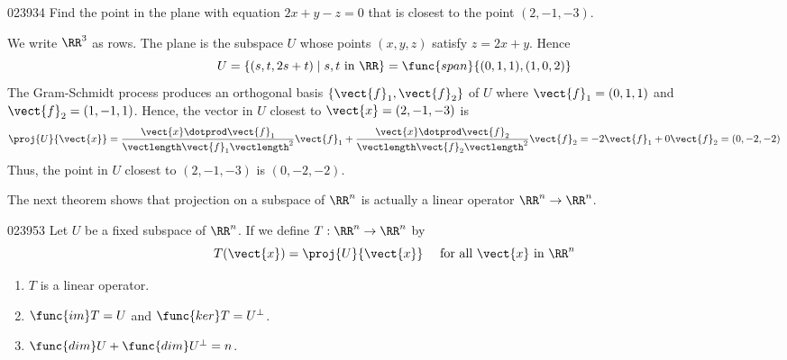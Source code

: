 \begin{example}{}{023934}
Find the point in the plane with equation $2x + y - z = 0$ that is closest to the point $(2, -1, -3)$.


\begin{solution}
  We write $\RR^3$ as rows. The plane is the subspace $U$ whose points $(x, y, z)$ satisfy $z = 2x + y$. Hence
\begin{equation*}
U = \{(s, t, 2s + t) \mid s,t \mbox{ in }\RR\} = \func{span}\{(0, 1, 1),(1, 0, 2)\}
\end{equation*}
The Gram-Schmidt process produces an orthogonal basis $\{\vect{f}_{1}, \vect{f}_{2}\}$ of $U$ where $\vect{f}_{1} = (0, 1, 1)$ and $\vect{f}_{2} = (1, -1, 1)$. Hence, the vector in $U$ closest to $\vect{x} = (2, -1, -3)$ is
\begin{equation*}
\proj{U}{\vect{x}} =\frac{\vect{x} \dotprod \vect{f}_{1}}{\vectlength \vect{f}_{1} \vectlength^2}\vect{f}_{1} + \frac{\vect{x} \dotprod \vect{f}_{2}}{\vectlength \vect{f}_{2} \vectlength^2}\vect{f}_{2} = -2\vect{f}_{1} + 0\vect{f}_{2} = (0, -2, -2)
\end{equation*}
Thus, the point in $U$ closest to $(2, -1, -3)$ is $(0, -2, -2)$.
\end{solution}
\end{example}

The next theorem shows that projection on a subspace of $\RR^n$ is actually a linear operator $\RR^n \to \RR^n$.


\begin{theorem}{}{023953}
Let $U$ be a fixed subspace of $\RR^n$. If we define $T : \RR^n \to \RR^n$ by 
\begin{equation*}
T(\vect{x}) = \proj{U}{\vect{x}} \quad \mbox{ for all }\vect{x}\mbox{ in }\RR^n
\end{equation*}
\begin{enumerate}
\item $T$ is a linear operator.

\item $\func{im}T = U$ and $\func{ker}T = U^\perp$.

\item $\func{dim}U + \func{dim}U^\perp = n$.

\end{enumerate}
\end{theorem}


